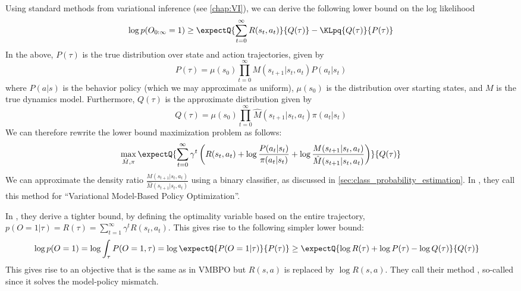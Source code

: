 {Using standard methods from variational inference (see \cref{chap:VI}),
we can derive the following  lower bound
on the log likelihood
\begin{equation*}
  \log p(O_{0:\infty}=1) \geq
  \expectQ{\sum_{t=0}^{\infty} R(s_t,a_t)}{Q(\tau)}
  -\KLpq{Q(\tau)}{P(\tau)}
\end{equation*}
In the above,
$P(\tau)$ is
the true distribution over state and action trajectories, given by
\begin{equation*}
  P(\tau) = \mu(s_0) \prod_{t=0}^{\infty} M(s_{t+1}|s_t,a_t)
  P(a_t|s_t)
\end{equation*}
where $P(a|s)$ is the behavior policy (which we may approximate as uniform),
$\mu(s_0)$ is the distribution over starting states,
and $M$ is the true dynamics model.
Furthermore, $Q(\tau)$ is the approximate distribution
given by
\begin{equation*}
  Q(\tau) = \mu(s_0) \prod_{t=0}^{\infty} \hat{M}(s_{t+1}|s_t,a_t)
  \pi(a_t|s_t)
\end{equation*}
We can therefore rewrite the lower bound maximization problem
as follows:
\begin{equation*}
  \max_{\hat{M},\pi}
  \expectQ{\sum_{t=0}^{\infty} \gamma^t\left(
    R(s_t,a_t) + \log \frac{P(a_t|s_t)}{\pi(a_t|s_t)}
    + \log \frac{M(s_{t+1}|s_t,a_t)}{\hat{M}(s_{t+1}|s_t,a_t)}\right)
    }{Q(\tau)}
\end{equation*}
We can approximate the  density ratio
$\frac{M(s_{t+1}|s_t,a_t)}{\hat{M}(s_{t+1}|s_t,a_t)}$
using a binary classifier,
as discussed in \cref{sec:class_probability_estimation}.
In \citep{Chow2021}, they call this method
for ``Variational Model-Based Policy Optimization''.


In \citep{Eysenbach2022}, they derive a tighter bound,
by defining the optimality variable based on the entire trajectory,
$p(O=1|\tau) = R(\tau) = \sum_{t=1}^{\infty} \gamma^t R(s_t,a_t)$.
This gives rise to the following simpler lower bound:
\begin{eqnarray*}
  \log p(O=1) &= \log \int_{\tau} P(O=1,\tau)
  = \log \expectQ{P(O=1|\tau)}{P(\tau)}
  \geq \expectQ{\log R(\tau) + \log P(\tau) - \log Q(\tau)}{Q(\tau)}
\end{eqnarray*}
This gives rise to   an objective that is the same
as in VMBPO but $R(s,a)$ is replaced by $\log R(s,a)$.
They call their method
,
so-called since it solves the model-policy
mismatch.

}
